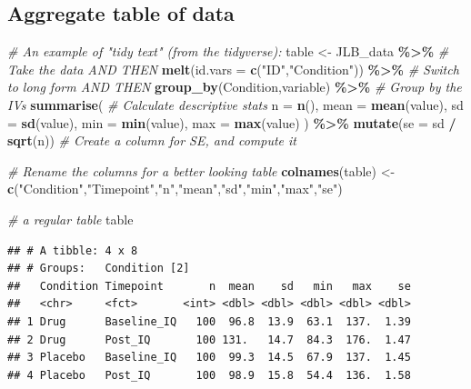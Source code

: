 \documentclass[
]{book}
\newenvironment{Shaded}{\begin{snugshade}}{\end{snugshade}}
\newcommand{\AttributeTok}[1]{\textcolor[rgb]{0.13,0.29,0.53}{#1}}
\newcommand{\CommentTok}[1]{\textcolor[rgb]{0.56,0.35,0.01}{\textit{#1}}}
\newcommand{\FunctionTok}[1]{\textcolor[rgb]{0.13,0.29,0.53}{\textbf{#1}}}
\newcommand{\NormalTok}[1]{#1}
\newcommand{\OtherTok}[1]{\textcolor[rgb]{0.56,0.35,0.01}{#1}}
\newcommand{\SpecialCharTok}[1]{\textcolor[rgb]{0.81,0.36,0.00}{\textbf{#1}}}
\newcommand{\StringTok}[1]{\textcolor[rgb]{0.31,0.60,0.02}{#1}}
\begin{document}
\subsection*{Aggregate table of data}\label{aggregate-table-of-data}

\begin{Shaded}
\begin{Highlighting}[]
\CommentTok{\# An example of "tidy text" (from the tidyverse):}
\NormalTok{table }\OtherTok{\textless{}{-}}\NormalTok{ JLB\_data }\SpecialCharTok{\%\textgreater{}\%} \CommentTok{\# Take the data AND THEN}
  \FunctionTok{melt}\NormalTok{(}\AttributeTok{id.vars =} \FunctionTok{c}\NormalTok{(}\StringTok{"ID"}\NormalTok{,}\StringTok{"Condition"}\NormalTok{)) }\SpecialCharTok{\%\textgreater{}\%} \CommentTok{\# Switch to long form AND THEN}
  \FunctionTok{group\_by}\NormalTok{(Condition,variable) }\SpecialCharTok{\%\textgreater{}\%} \CommentTok{\# Group by the IVs}
  \FunctionTok{summarise}\NormalTok{( }\CommentTok{\# Calculate descriptive stats}
    \AttributeTok{n =} \FunctionTok{n}\NormalTok{(),}
    \AttributeTok{mean =} \FunctionTok{mean}\NormalTok{(value),}
    \AttributeTok{sd =} \FunctionTok{sd}\NormalTok{(value),}
    \AttributeTok{min =} \FunctionTok{min}\NormalTok{(value),}
    \AttributeTok{max =} \FunctionTok{max}\NormalTok{(value)}
\NormalTok{  ) }\SpecialCharTok{\%\textgreater{}\%} \FunctionTok{mutate}\NormalTok{(}\AttributeTok{se =}\NormalTok{ sd }\SpecialCharTok{/} \FunctionTok{sqrt}\NormalTok{(n)) }\CommentTok{\# Create a column for SE, and compute it}

\CommentTok{\# Rename the columns for a better looking table}
\FunctionTok{colnames}\NormalTok{(table) }\OtherTok{\textless{}{-}} \FunctionTok{c}\NormalTok{(}\StringTok{"Condition"}\NormalTok{,}\StringTok{"Timepoint"}\NormalTok{,}\StringTok{"n"}\NormalTok{,}\StringTok{"mean"}\NormalTok{,}\StringTok{"sd"}\NormalTok{,}\StringTok{"min"}\NormalTok{,}\StringTok{"max"}\NormalTok{,}\StringTok{"se"}\NormalTok{)}

\CommentTok{\# a regular table}
\NormalTok{table}
\end{Highlighting}
\end{Shaded}

\begin{verbatim}
## # A tibble: 4 x 8
## # Groups:   Condition [2]
##   Condition Timepoint       n  mean    sd   min   max    se
##   <chr>     <fct>       <int> <dbl> <dbl> <dbl> <dbl> <dbl>
## 1 Drug      Baseline_IQ   100  96.8  13.9  63.1  137.  1.39
## 2 Drug      Post_IQ       100 131.   14.7  84.3  176.  1.47
## 3 Placebo   Baseline_IQ   100  99.3  14.5  67.9  137.  1.45
## 4 Placebo   Post_IQ       100  98.9  15.8  54.4  136.  1.58
\end{verbatim}
\end{document}

